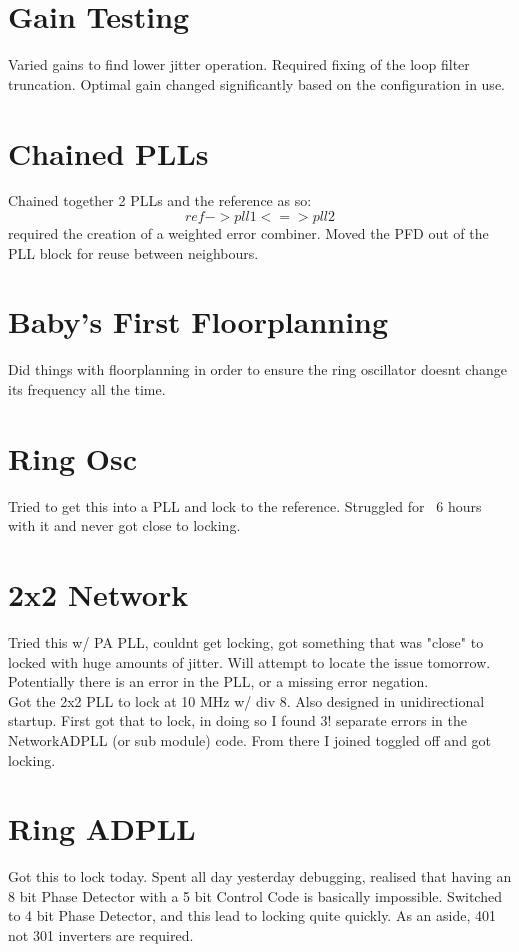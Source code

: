 \documentclass[a4paper,12pt]{report}
\begin{document}
\section*{Gain Testing}
Varied gains to find lower jitter operation. Required fixing of the loop filter truncation. Optimal gain changed significantly based on the configuration in use.

\section*{Chained PLLs}
Chained together 2 PLLs and the reference as so:
\begin{equation*}
	ref -> pll1 <=> pll2
\end{equation*}
required the creation of a weighted error combiner. Moved the PFD out of the PLL block for reuse between neighbours.

\section*{Baby's First Floorplanning}
Did things with floorplanning in order to ensure the ring oscillator doesnt change its frequency all the time.

\section*{Ring Osc}
Tried to get this into a PLL and lock to the reference. Struggled for ~6 hours with it and never got close to locking.

\section*{2x2 Network}
Tried this w/ PA PLL,  couldnt get locking, got something that was "close" to locked with huge amounts of jitter. Will attempt to locate the issue tomorrow. Potentially there is an error in the PLL, or a missing error negation.\\
Got the 2x2 PLL to lock at 10 MHz w/ div 8. Also designed in unidirectional startup. First got that to lock, in doing so I found 3! separate errors in the NetworkADPLL (or sub module) code. From there I joined toggled off and got locking.

\section*{Ring ADPLL}
Got this to lock today. Spent all day yesterday debugging, realised that having an 8 bit Phase Detector with a 5 bit Control Code is basically impossible. Switched to 4 bit Phase Detector, and this lead to locking quite quickly. As an aside, 401 not 301 inverters are required.
\end{document}
